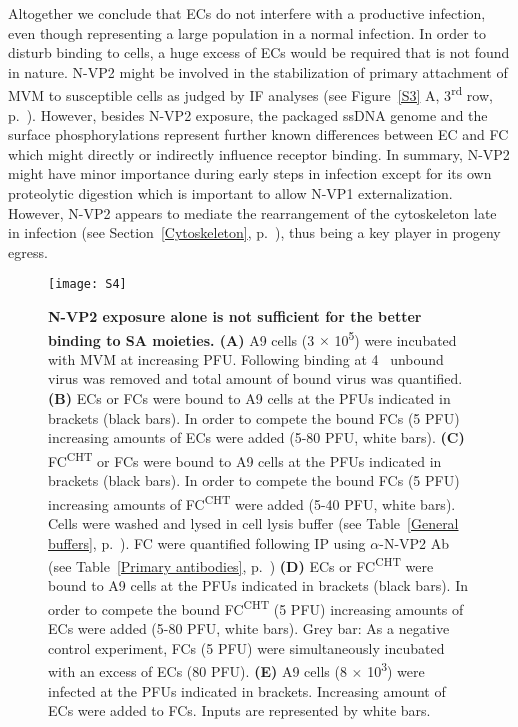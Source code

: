 Altogether we conclude that ECs do not interfere with a productive infection, even though representing a large population in a normal infection. In order to disturb binding to cells, a huge excess of ECs would be required that is not found in nature. N-VP2 might be involved in the stabilization of primary attachment of MVM to susceptible cells as judged by IF analyses (see Figure~\ref{S3} A, 3\textsuperscript{rd} row, p.~\pageref{S3}). However, besides N-VP2 exposure, the packaged ssDNA genome and the surface phosphorylations represent further known differences between EC and FC which might directly or indirectly influence receptor binding. In summary, N-VP2 might have minor importance during early steps in infection except for its own proteolytic digestion which is important to allow N-VP1 externalization. However, N-VP2 appears to mediate the rearrangement of the cytoskeleton late in infection (see Section~\ref{Cytoskeleton}, p.~\pageref{Cytoskeleton}), thus being a key player in progeny egress.        



\begin{figure}
\centering
  \texttt{[image: S4]}
  \caption[N-VP2 exposure alone is not sufficient for the better binding to SA moieties.]
   {\textbf{N-VP2 exposure alone is not sufficient for the better binding to SA moieties. (A)} A9 cells (3 $\times$ 10\textsuperscript{5}) were incubated with MVM at increasing PFU. Following binding at 4 \textcelsius~unbound virus was removed and total amount of bound virus was quantified. \textbf{(B)} ECs or FCs were bound to A9 cells at the PFUs indicated in brackets (black bars). In order to compete the bound FCs (5 PFU) increasing amounts of ECs were added (5-80 PFU, white bars). \textbf{(C)} FC\textsuperscript{CHT} or FCs were bound to A9 cells at the PFUs indicated in brackets (black bars). In order to compete the bound FCs (5 PFU) increasing amounts of FC\textsuperscript{CHT} were added (5-40 PFU, white bars). Cells were washed and lysed in cell lysis buffer (see Table~\ref{General buffers}, p.~\pageref{General buffers}). FC were quantified following IP using $\alpha$-N-VP2 Ab (see Table~\ref{Primary antibodies}, p.~\pageref{Primary antibodies}) \textbf{(D)} ECs or FC\textsuperscript{CHT} were bound to A9 cells at the PFUs indicated in brackets (black bars). In order to compete the bound FC\textsuperscript{CHT} (5 PFU) increasing amounts of ECs were added (5-80 PFU, white bars). Grey bar: As a negative control experiment, FCs (5 PFU) were simultaneously incubated with an excess of ECs (80 PFU). \textbf{(E)} A9 cells (8 $\times$ 10\textsuperscript{3}) were infected at the PFUs indicated in brackets. Increasing amount of ECs were added to FCs. Inputs are represented by white bars.} 
\label{S4}
\end{figure}










